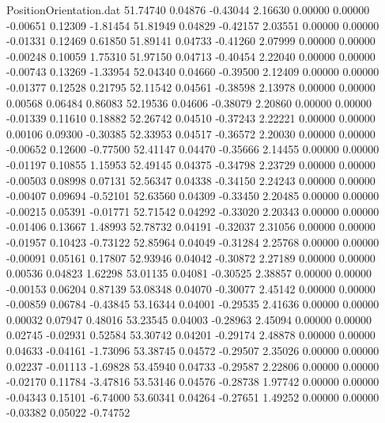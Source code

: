 \begin{filecontents}{PositionOrientation.dat}
  51.74740    0.04876   -0.43044     2.16630    0.00000    0.00000   -0.00651    0.12309   -1.81454
  51.81949    0.04829   -0.42157     2.03551    0.00000    0.00000   -0.01331    0.12469    0.61850
  51.89141    0.04733   -0.41260     2.07999    0.00000    0.00000   -0.00248    0.10059    1.75310
  51.97150    0.04713   -0.40454     2.22040    0.00000    0.00000   -0.00743    0.13269   -1.33954
  52.04340    0.04660   -0.39500     2.12409    0.00000    0.00000   -0.01377    0.12528    0.21795
  52.11542    0.04561   -0.38598     2.13978    0.00000    0.00000    0.00568    0.06484    0.86083
  52.19536    0.04606   -0.38079     2.20860    0.00000    0.00000   -0.01339    0.11610    0.18882
  52.26742    0.04510   -0.37243     2.22221    0.00000    0.00000    0.00106    0.09300   -0.30385
  52.33953    0.04517   -0.36572     2.20030    0.00000    0.00000   -0.00652    0.12600   -0.77500
  52.41147    0.04470   -0.35666     2.14455    0.00000    0.00000   -0.01197    0.10855    1.15953
  52.49145    0.04375   -0.34798     2.23729    0.00000    0.00000   -0.00503    0.08998    0.07131
  52.56347    0.04338   -0.34150     2.24243    0.00000    0.00000   -0.00407    0.09694   -0.52101
  52.63560    0.04309   -0.33450     2.20485    0.00000    0.00000   -0.00215    0.05391   -0.01771
  52.71542    0.04292   -0.33020     2.20343    0.00000    0.00000   -0.01406    0.13667    1.48993
  52.78732    0.04191   -0.32037     2.31056    0.00000    0.00000   -0.01957    0.10423   -0.73122
  52.85964    0.04049   -0.31284     2.25768    0.00000    0.00000   -0.00091    0.05161    0.17807
  52.93946    0.04042   -0.30872     2.27189    0.00000    0.00000    0.00536    0.04823    1.62298
  53.01135    0.04081   -0.30525     2.38857    0.00000    0.00000   -0.00153    0.06204    0.87139
  53.08348    0.04070   -0.30077     2.45142    0.00000    0.00000   -0.00859    0.06784   -0.43845
  53.16344    0.04001   -0.29535     2.41636    0.00000    0.00000    0.00032    0.07947    0.48016
  53.23545    0.04003   -0.28963     2.45094    0.00000    0.00000    0.02745   -0.02931    0.52584
  53.30742    0.04201   -0.29174     2.48878    0.00000    0.00000    0.04633   -0.04161   -1.73096
  53.38745    0.04572   -0.29507     2.35026    0.00000    0.00000    0.02237   -0.01113   -1.69828
  53.45940    0.04733   -0.29587     2.22806    0.00000    0.00000   -0.02170    0.11784   -3.47816
  53.53146    0.04576   -0.28738     1.97742    0.00000    0.00000   -0.04343    0.15101   -6.74000
  53.60341    0.04264   -0.27651     1.49252    0.00000    0.00000   -0.03382    0.05022   -0.74752

\end{filecontents}
